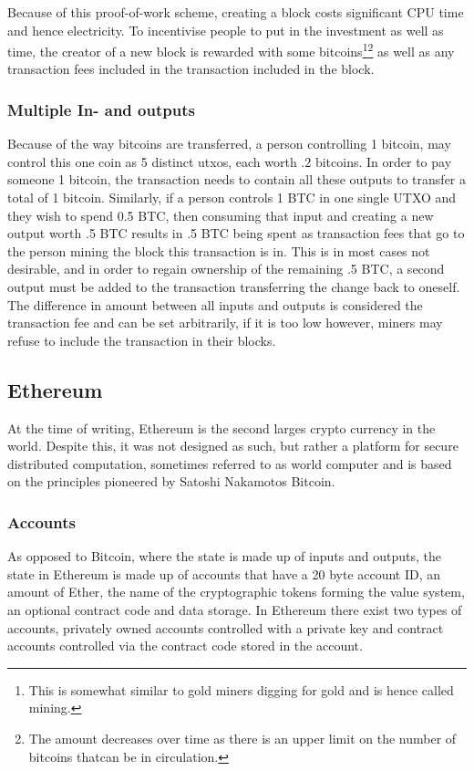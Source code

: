 \documentclass[12pt,msc,a4paper,oneside]{ucl_thesis}
\begin{document}
Because of this proof-of-work scheme, creating a block costs significant CPU time and hence electricity. To incentivise people to put in the investment as well as time, the creator of a new block is rewarded with some bitcoins\footnote{This is somewhat similar to gold miners digging for gold and is hence called mining.}\footnote{The amount decreases over time as there is an upper limit on the number of bitcoins thatcan be in circulation.} as well as any transaction fees included in the transaction included in the block. \cite{bitcoin:satoshi}

\subsubsection{Multiple In- and outputs} \label{sec:background_bitcoin:multiple_in_out}
Because of the way bitcoins are transferred, a person controlling 1 bitcoin, may control this one coin as 5 distinct utxos, each worth .2 bitcoins. In order to pay someone 1 bitcoin, the transaction needs to contain all these outputs to transfer a total of 1 bitcoin. Similarly, if a person controls 1 BTC in one single UTXO and they wish to spend 0.5 BTC, then consuming that input and creating a new output worth .5 BTC results in .5 BTC being spent as transaction fees that go to the person mining the block this transaction is in. This is in most cases not desirable, and in order to regain ownership of the remaining .5 BTC, a second output must be added to the transaction transferring the change back to oneself. The difference in amount between all inputs and outputs is considered the transaction fee and can be set arbitrarily, if it is too low however, miners may refuse to include the transaction in their blocks. \cite{bitcoin:satoshi}


\subsection{Ethereum} \label{sec:background_ethereum}
At the time of writing, Ethereum is the second larges crypto currency in the world. Despite this, it was not designed as such, but rather a platform for secure distributed computation, sometimes referred to as world computer and is based on the principles pioneered by Satoshi Nakamotos Bitcoin. \cite{ethereum:vitalik_buterin} \cite{ethereum:gavin_wood}

\subsubsection{Accounts}
As opposed to Bitcoin, where the state is made up of inputs and outputs, the state in Ethereum is made up of accounts that have a 20 byte account ID, an amount of Ether, the name of the cryptographic tokens forming the value system, an optional contract code and data storage. In Ethereum there exist two types of accounts, privately owned accounts controlled with a private key and contract accounts controlled via the contract code stored in the account. \cite{ethereum:vitalik_buterin} \cite{ethereum:gavin_wood}
\end{document}
